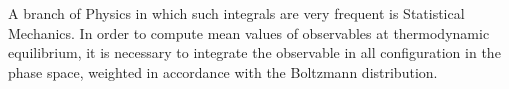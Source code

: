 A branch of Physics in which such integrals are very frequent is Statistical Mechanics.
In order to compute mean values of observables at thermodynamic equilibrium,
it is necessary to integrate the observable in all configuration in the phase space, weighted in accordance with the Boltzmann distribution.

\endgroup

\vfill
